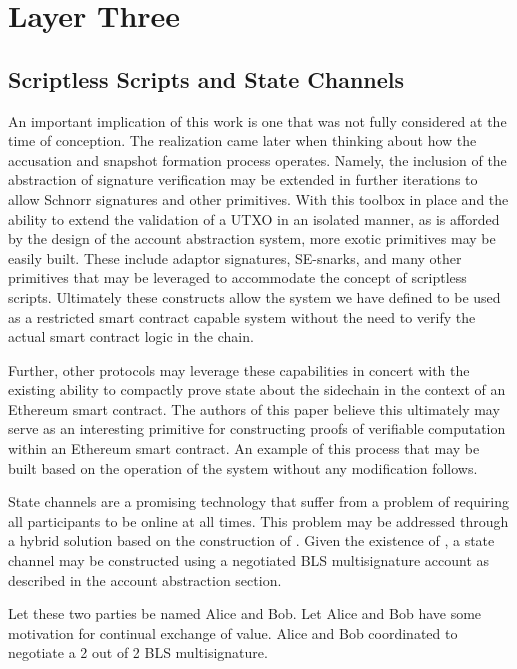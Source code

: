 \section{Layer Three}

\subsection{Scriptless Scripts and State Channels}

An important implication of this work is one that was not fully
considered at the time of conception.
The realization came later when thinking about how the accusation and
snapshot formation process operates.
Namely, the inclusion of the abstraction of signature verification may
be extended in further iterations to allow Schnorr signatures and other
primitives.
With this toolbox in place and the ability to extend the validation of
a UTXO in an isolated manner, as is afforded by the design of the
account abstraction system, more exotic primitives may be easily built.
These include adaptor signatures, SE-snarks, and many other primitives
that may be leveraged to accommodate the concept of scriptless scripts.
Ultimately these constructs allow the system we have defined to be used
as a restricted smart contract capable system without the need to
verify the actual smart contract logic in the chain.

Further, other protocols may leverage these capabilities in concert
with the existing ability to compactly prove state about the sidechain
in the context of an Ethereum smart contract.
The authors of this paper believe this ultimately may serve as an
interesting primitive for constructing proofs of verifiable computation
within an Ethereum smart contract.
An example of this process that may be built based on the operation of
the system without any modification follows.

State channels are a promising technology that suffer from a problem of
requiring all participants to be online at all times.
This problem may be addressed through a hybrid solution based on the
construction of \LayerTwoLong{}.
Given the existence of \LayerTwoLong{}, a state channel may be constructed
using a negotiated BLS multisignature account as described in the
account abstraction section.

Let these two parties be named Alice and Bob.
Let Alice and Bob have some motivation for continual exchange of value.
Alice and Bob coordinated to negotiate a 2 out of 2 BLS multisignature.

